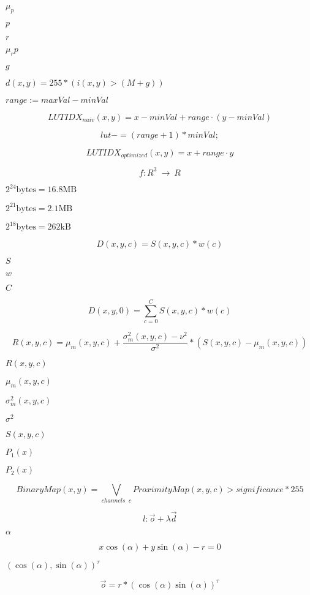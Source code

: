 \documentclass{article}
\begin{document}
$\mu_p$
\pagebreak

$p$
\pagebreak

$r$
\pagebreak

$\mu_r{p}$
\pagebreak

$g$
\pagebreak

$ d(x,y) = 255 * (i(x,y) > (M+g) ) $
\pagebreak

$range := maxVal - minVal$
\pagebreak

\[ LUTIDX_{naiv}(x,y) = x-minVal + range \cdot (y-minVal) \]
\pagebreak

\[ lut -= (range+1)*minVal; \]
\pagebreak

\[ LUTIDX_{optimized}(x,y) = x + range\cdot y \]
\pagebreak

\[ f:R^3~\rightarrow~R \]
\pagebreak

$2^{24} \mbox{bytes} = 16.8\mbox{MB}$
\pagebreak

$2^{21} \mbox{bytes} = 2.1\mbox{MB}$
\pagebreak

$2^{18} \mbox{bytes}=262\mbox{kB}$
\pagebreak

\[ D(x,y,c) = S(x,y,c)*w(c) \]
\pagebreak

$S$
\pagebreak

$w$
\pagebreak

$C$
\pagebreak

\[ D(x,y,0) = \sum\limits_{c=0}^C S(x,y,c)*w(c) \]
\pagebreak

\[ R(x,y,c) = \mu_m(x,y,c) + \frac{\sigma_m^2(x,y,c)-\nu^2}{\sigma^2} * (S(x,y,c) - \mu_m(x,y,c)) \]
\pagebreak

$R(x,y,c)$
\pagebreak

$\mu_m(x,y,c)$
\pagebreak

$\sigma^2_m(x,y,c)$
\pagebreak

$\sigma^2 $
\pagebreak

$S(x,y,c)$
\pagebreak

$P_1(x)$
\pagebreak

$P_2(x)$
\pagebreak

\[ BinaryMap(x,y) = \bigvee\limits_{channels\;\; c} ProximityMap(x,y,c) > significance*255 \]
\pagebreak

\[ l: \vec{o}+\lambda \vec{d} \]
\pagebreak

$\alpha $
\pagebreak

\[ x \cos(\alpha) + y \sin(\alpha) - r = 0 \]
\pagebreak

$ (\cos(\alpha), \sin(\alpha) )^{\tau} $
\pagebreak

\[ \vec{o} = r * ( \cos(\alpha) \sin(\alpha) )^{\tau} \]
\pagebreak
\end{document}
